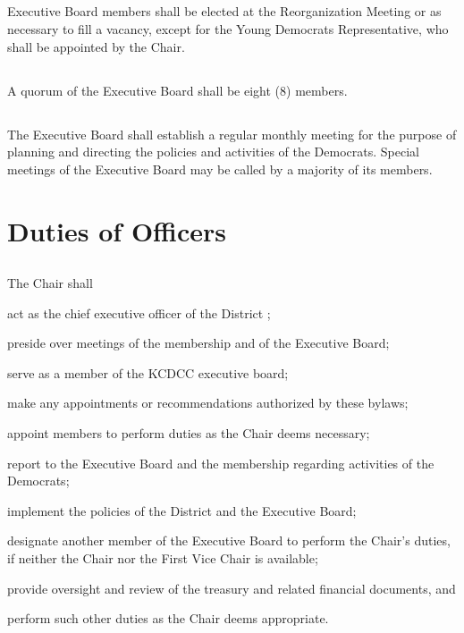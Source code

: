 \subsection{}
Executive Board members shall be elected at the Reorganization Meeting or as necessary to fill a vacancy, except for the Young Democrats Representative, who shall be appointed by the Chair.

\subsection{}
A quorum of the Executive Board shall be eight (8) members.

\subsection{}
The Executive Board shall establish a regular monthly meeting for the purpose of planning and directing the policies and activities of the \fortythird{}  Democrats. Special meetings of the Executive Board may be called by a majority of its members.

\section{Duties of Officers}
\subsection{}
The Chair shall
\begin{inlinealphalist}
    \item act as the chief executive officer of the \fortythird{} District ;
    \item preside over meetings of the membership and of the Executive Board;
    \item serve as a member of the KCDCC executive board;
    \item make any appointments or recommendations authorized by these bylaws;
    \item appoint members to perform duties as the Chair deems necessary;
    \item report to the Executive Board and the membership regarding activities of the \fortythird{}  Democrats;
    \item implement the policies of the \fortythird{} District  and the Executive Board;
    \item designate another member of the Executive Board to perform the Chair’s duties, if neither the Chair nor the First Vice Chair is available;
    \item provide oversight and review of the  treasury and related financial documents, and
    \item perform such other duties as the Chair deems appropriate.
\end{inlinealphalist}


